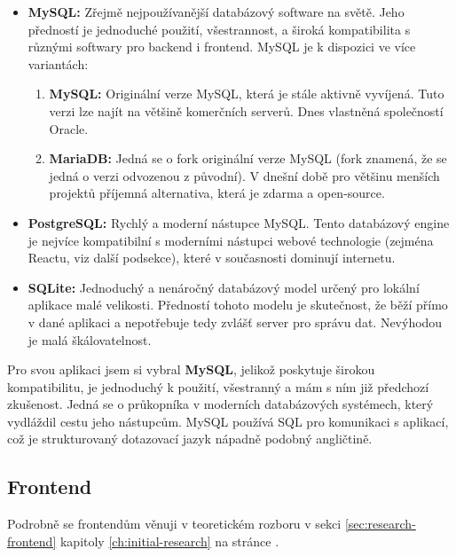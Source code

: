 \begin{itemize}
    \item \textbf{MySQL:} Zřejmě nejpoužívanější databázový software na světě.
        Jeho předností je jednoduché použití, všestrannost, a široká
        kompatibilita s různými softwary pro backend i frontend. MySQL
        je k dispozici ve více variantách:
        \begin{enumerate}
            \item \textbf{MySQL:} Originální verze MySQL, která je stále
                aktivně vyvíjená. Tuto verzi lze najít na většině komerčních
                serverů. Dnes vlastněná společností Oracle.
            \item \textbf{MariaDB:} Jedná se o fork originální verze MySQL
                (fork znamená, že se jedná o verzi odvozenou z původní).
                V dnešní době pro většinu menších projektů příjemná
                alternativa, která je zdarma a open-source.
        \end{enumerate}
    \item \textbf{PostgreSQL:} Rychlý a moderní nástupce MySQL. Tento
        databázový engine je nejvíce kompatibilní s moderními nástupci
        webové technologie (zejména Reactu, viz další podsekce), které
        v současnosti dominují internetu.
    \item \textbf{SQLite:} Jednoduchý a nenáročný databázový model určený
        pro lokální aplikace malé velikosti. Předností tohoto modelu
        je skutečnost, že běží přímo v dané aplikaci a nepotřebuje tedy
        zvlášť server pro správu dat. Nevýhodou je malá škálovatelnost.
\end{itemize}

Pro svou aplikaci jsem si vybral \textbf{MySQL}, jelikož poskytuje širokou
kompatibilitu, je jednoduchý k použití, všestranný a mám s ním již předchozí
zkušenost. Jedná se o průkopníka v moderních databázových systémech, který
vydláždil cestu jeho nástupcům. MySQL používá SQL pro komunikaci s aplikací,
což je strukturovaný dotazovací jazyk nápadně podobný angličtině.

\subsection{Frontend}
\label{sec:preps-frontend}

Podrobně se frontendům věnuji v teoretickém rozboru
v sekci \ref{sec:research-frontend} kapitoly \ref{ch:initial-research}
na stránce \pageref{sec:research-frontend}.

